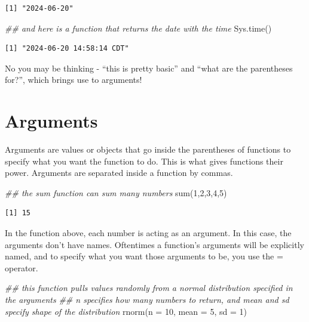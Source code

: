 \documentclass[
  letterpaper,
  DIV=11,
  numbers=noendperiod]{scrreprt}
\newenvironment{Shaded}{\begin{snugshade}}{\end{snugshade}}
\newcommand{\AttributeTok}[1]{\textcolor[rgb]{0.40,0.45,0.13}{#1}}
\newcommand{\DecValTok}[1]{\textcolor[rgb]{0.68,0.00,0.00}{#1}}
\newcommand{\DocumentationTok}[1]{\textcolor[rgb]{0.37,0.37,0.37}{\textit{#1}}}
\newcommand{\FunctionTok}[1]{\textcolor[rgb]{0.28,0.35,0.67}{#1}}
\newcommand{\NormalTok}[1]{\textcolor[rgb]{0.00,0.23,0.31}{#1}}
\begin{document}
\begin{verbatim}
[1] "2024-06-20"
\end{verbatim}

\begin{Shaded}
\begin{Highlighting}[]
\DocumentationTok{\#\# and here is a function that returns the date with the time}
\FunctionTok{Sys.time}\NormalTok{()}
\end{Highlighting}
\end{Shaded}

\begin{verbatim}
[1] "2024-06-20 14:58:14 CDT"
\end{verbatim}

No you may be thinking - ``this is pretty basic'' and ``what are the
parentheses for?'', which brings use to arguments!

\section{Arguments}\label{arguments}

Arguments are values or objects that go inside the parentheses of
functions to specify what you want the function to do. This is what
gives functions their power. Arguments are separated inside a function
by commas.

\begin{Shaded}
\begin{Highlighting}[]
\DocumentationTok{\#\# the sum function can sum many numbers}
\FunctionTok{sum}\NormalTok{(}\DecValTok{1}\NormalTok{,}\DecValTok{2}\NormalTok{,}\DecValTok{3}\NormalTok{,}\DecValTok{4}\NormalTok{,}\DecValTok{5}\NormalTok{)}
\end{Highlighting}
\end{Shaded}

\begin{verbatim}
[1] 15
\end{verbatim}

In the function above, each number is acting as an argument. In this
case, the arguments don't have names. Oftentimes a function's arguments
will be explicitly named, and to specify what you want those arguments
to be, you use the = operator.

\begin{Shaded}
\begin{Highlighting}[]
\DocumentationTok{\#\# this function pulls values randomly from a normal distribution specified in the arguments}
\DocumentationTok{\#\# n specifies how many numbers to return, and mean and sd specify shape of the distribution}
\FunctionTok{rnorm}\NormalTok{(}\AttributeTok{n =} \DecValTok{10}\NormalTok{, }\AttributeTok{mean =} \DecValTok{5}\NormalTok{, }\AttributeTok{sd =} \DecValTok{1}\NormalTok{)}
\end{Highlighting}
\end{Shaded}
\end{document}
